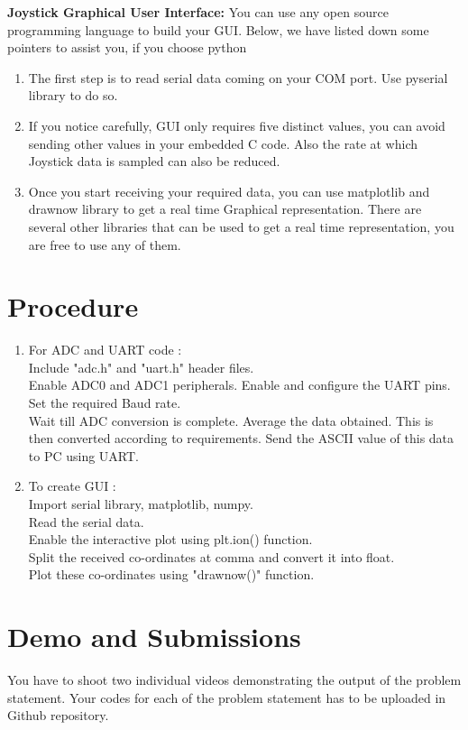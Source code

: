 \documentclass{article} %
\newcounter{other}
\newcounter{source}
\begin{document}
\textbf{Joystick Graphical User Interface:}
\newline
You can use any open source programming language to build your GUI. Below, we have listed down some pointers to assist you, if you choose python
\begin{enumerate}
\item The first step is to read serial data coming on your COM port. Use pyserial library to do so.
\item If you notice carefully, GUI only requires five distinct values, you can avoid sending other values in your embedded C code. Also the rate at which Joystick data is sampled can also be reduced.
\item
Once you start receiving your required data, you can use matplotlib and drawnow library to get a real time Graphical representation. There are several other libraries that can be used to get a real time representation, you are free to use any of them. 
\end{enumerate}



\section {Procedure}
\begin{enumerate}
\item For ADC and UART code :\\
	Include "adc.h" and "uart.h" header files.\\
    Enable ADC0 and ADC1 peripherals. Enable and configure the UART pins. Set the required Baud rate. \\
    Wait till ADC conversion is complete. Average the data obtained. This is then converted according to requirements. Send the ASCII value of this data to PC using UART.
\item To create GUI :\\
	Import serial library, matplotlib, numpy.\\
    Read the serial data.\\
    Enable the interactive plot using plt.ion() function.\\
    Split the received co-ordinates at comma and convert it into float.\\
    Plot these co-ordinates using "drawnow()" function.
    
\end{enumerate}


\section {Demo and Submissions}
You have to shoot two individual videos demonstrating the output of the problem statement.
Your codes for each of the problem statement has to be uploaded in Github repository.
\end{document}
